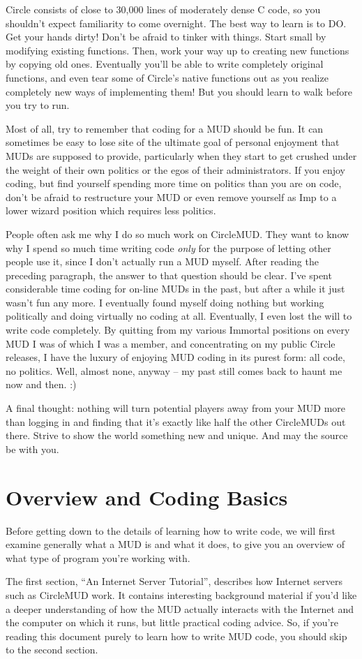 \documentclass[11pt]{article}
\begin{document}
\par
Circle consists of close to 30,000 lines of moderately dense C code, so you shouldn't expect familiarity to come overnight.  The best way to learn is to DO.  Get your hands dirty!  Don't be afraid to tinker with things.  Start small by modifying existing functions.  Then, work your way up to creating new functions by copying old ones.  Eventually you'll be able to write completely original functions, and even tear some of Circle's native functions out as you realize completely new ways of implementing them!  But you should learn to walk before you try to run.
\par
Most of all, try to remember that coding for a MUD should be fun.  It can sometimes be easy to lose site of the ultimate goal of personal enjoyment that MUDs are supposed to provide, particularly when they start to get crushed under the weight of their own politics or the egos of their administrators. If you enjoy coding, but find yourself spending more time on politics than you are on code, don't be afraid to restructure your MUD or even remove yourself as Imp to a lower wizard position which requires less politics.
\par
People often ask me why I do so much work on CircleMUD.  They want to know why I spend so much time writing code {\em only} for the purpose of letting other people use it, since I don't actually run a MUD myself.  After reading the preceding paragraph, the answer to that question should be clear.  I've spent considerable time coding for on-line MUDs in the past, but after a while it just wasn't fun any more.  I eventually found myself doing nothing but working politically and doing virtually no coding at all.  Eventually, I even lost the will to write code completely.  By quitting from my various Immortal positions on every MUD I was of which I was a member, and concentrating on my public Circle releases, I have the luxury of enjoying MUD coding in its purest form: all code, no politics.  Well, almost none, anyway -- my past still comes back to haunt me now and then. :)
\par
A final thought: nothing will turn potential players away from your MUD more than logging in and finding that it's exactly like half the other CircleMUDs out there.  Strive to show the world something new and unique.  And may the source be with you.

\section{Overview and Coding Basics}
Before getting down to the details of learning how to write code, we will first examine generally what a MUD is and what it does, to give you an overview of what type of program you're working with.
\par
The first section, ``An Internet Server Tutorial'', describes how Internet servers such as CircleMUD work.  It contains interesting background material if you'd like a deeper understanding of how the MUD actually interacts with the Internet and the computer on which it runs, but little practical coding advice.  So, if you're reading this document purely to learn how to write MUD code, you should skip to the second section.
\end{document}
